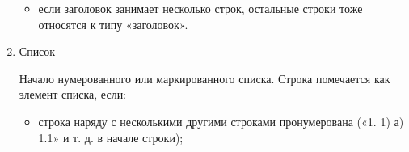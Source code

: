 \documentclass[a4paper,12pt]{article}
\makeatletter
\newenvironment{restoretext}%
    {\@parboxrestore%
     \begin{adjustwidth}{}{\leftmargin}%
    }{\end{adjustwidth}}
\makeatother
\begin{document}
\begin{enumerate}
\begin{itemize}
		\item если заголовок занимает несколько строк, остальные строки тоже относятся к типу «заголовок».

		\vspace{0.5cm}

		\begin{restoretext}
		\end{restoretext}

	\end{itemize}

	\item Список

	Начало нумерованного или маркированного списка. Строка помечается как элемент списка, если:

	\begin{itemize}
		\item строка наряду с несколькими другими строками пронумерована («1. 1) а) 1.1» и т. д. в начале строки);

		\vspace{0.5cm}

		\begin{restoretext}
		\end{restoretext}

		\vspace{0.5cm}

		\begin{restoretext}
		\end{restoretext}

		\vspace{0.5cm}


\end{itemize}
\end{enumerate}
\end{document}

